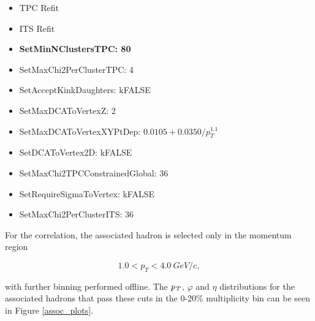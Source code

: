 \documentclass[ALICE,manyauthors]{ALICE_analysis_notes}
\begin{document}
\begin{itemize}
\begin{itemize}
    \item TPC Refit
    \item ITS Refit
	\item \textbf{SetMinNClustersTPC: 80}
	\item SetMaxChi2PerClusterTPC: 4
	\item SetAcceptKinkDaughters: kFALSE
	\item SetMaxDCAToVertexZ: 2
	\item SetMaxDCAToVertexXYPtDep: $0.0105+0.0350/p_{T}^{1.1}$
	\item SetDCAToVertex2D: kFALSE
	\item SetMaxChi2TPCConstrainedGlobal: 36
	\item SetRequireSigmaToVertex: kFALSE
	\item SetMaxChi2PerClusterITS: 36
\end{itemize}

For the correlation, the associated hadron is selected only in the momentum region

$${1.0 < p_{T} < \SI{4.0}{GeV/c}},$$ 

with further binning performed offline. The $\it{p}_{T}$, $\varphi$ and $\eta$ distributions for the associated hadrons that pass these cuts in the 0-20\% multiplicity bin can be seen in Figure \ref{assoc_plots}.


\end{itemize}
\end{document}
